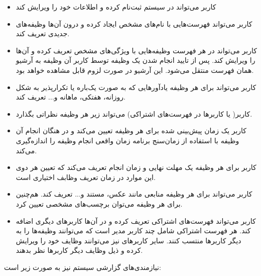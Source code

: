\documentclass{article}
\begin{document}
\begin{itemize}

\item کاربر می‌تواند در سیستم ثبت‌نام کرده و اطلاعات خود را ویرایش کند

\item کاربر می‌تواند فهرست‌هایی  با نام‌‌های مشخص ایجاد کرده و درون آن‌‌ها وظیفه‌های جدیدی تعریف کند.

\item کاربر می‌تواند در هر فهرست‌ وظیفه‌هایی با ویژگی‌های مشخص تعریف کرده و آن‌ها را ویرایش کند. پس از تایید انجام شدن یک وظیفه توسط کاربر آن وظیفه به آرشیو همان فهرست منتقل می‌شود. این آرشیو در صورت لزوم قابل مشاهده خواهد بود.

\item کاربر می‌تواند برای هر وظیفه یاد‌آور‌هایی که به صورت یک‌باره یا تکرار‌پذیر به شکل روزانه، هفتکی، ماهانه و... تعریف کند.

\item کاربر( یا کاربرها در فهرست‌های اشتراکی) می‌تواند زیر هر وظیفه‌ نظر‌اتی بگذارد.

\item کاربر یک زمان پیش‌بینی شده برای هر وظیفه تعیین می‌کند و در هنگان انجام آن وظیفه با استفاده از زمان‌سنج برنامه زمان واقعی انجام وظیفه را اندازه‌گیری می‌کند.

\item کاربر برای هر وظیفه یک مهلت نهایی و زمان انجام تعریف می‌کند که تعیین هر دوی این موارد در زمان تعریف وظابف اختیاری است.

\item کاربر می‌تواند برای هر وظیفه منابعی مانند عکس، مستند و... تعریف کند. هم‌چنین برای هر وظیفه می‌توان برچسب‌های مشخصی تعیین کرد.

\item کاربر می‌تواند فهرست‌های اشتراکی تعریف کرده و در آن‌ها کاربر‌های دیگری اضافه کند. هر فهرست اشتراکی شامل چند کاربر مدیر است که می‌توانند وظیفه‌ها را به دیگر کاربر‌ها منتسب کنند. سایر کاربر‌های نیز می‌توانند وظایف خود را ویرایش کرده و ذیل وظایف دیگر کاربر‌ها نظر بدهند.

\end{itemize}

نیاز‌مندی‌های گزارشی سیستم نیز به صورت زیر است:
\end{document}
